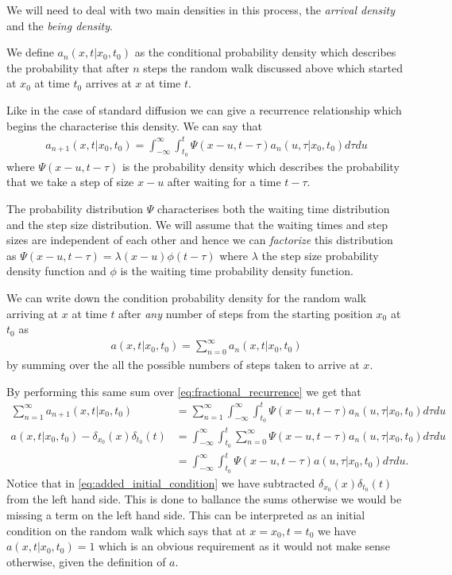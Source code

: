 We will need to deal with two main densities in this process, the \emph{arrival density} and the \emph{being density}. 

We define $ a_n(x,t|x_0,t_0) $ as the conditional probability density which describes the probability that after $ n $ steps the random walk discussed above which started at $ x_0 $ at time $ t_0 $ arrives at $ x $ at time $ t $. 

Like in the case of standard diffusion we can give a recurrence relationship which begins the characterise this density. We can say that
\begin{align}
    \label{eq:fractional_recurrence}
    a_{n+1}(x,t|x_0,t_0) = \int_{-\infty}^\infty \int_{t_0}^t \Psi(x - u, t - \tau)a_n(u, \tau|x_0, t_0) d\tau du
\end{align}
where $ \Psi(x - u, t - \tau) $ is the probability density which describes the probability that we take a step of size $ x - u $ after waiting for a time $ t - \tau $. 

The probability distribution $ \Psi $ characterises both the waiting time distribution and the step size distribution. We will assume that the waiting times and step sizes are independent of each other and hence we can \emph{factorize} this distribution as $ \Psi(x - u, t - \tau) = \lambda(x - u)\phi(t - \tau) $ where $ \lambda $ the step size probability density function and $ \phi $ is the waiting time probability density function.

We can write down the condition probability density for the random walk arriving at $ x $ at time $ t $ after \emph{any} number of steps from the starting position $ x_0 $ at $ t_0 $ as
\begin{align}
    a(x,t|x_0,t_0) = \sum_{n=0}^\infty a_n(x,t|x_0,t_0) 
\end{align}
by summing over the all the possible numbers of steps taken to arrive at $ x $. 

By performing this same sum over \eqref{eq:fractional_recurrence} we get that
\begin{align}
   \sum_{n=1}^\infty a_{n+1}(x,t|x_0,t_0) &= \sum_{n=1}^\infty \int_{-\infty}^\infty \int_{t_0}^t \Psi(x - u, t - \tau)a_n(u, \tau|x_0, t_0) d\tau du \\
    \label{eq:added_initial_condition}
    a(x,t|x_0,t_0) - \delta_{x_0}(x) \delta_{t_0}(t) &=  \int_{-\infty}^\infty \int_{t_0}^t \sum_{n=0}^\infty \Psi(x - u, t - \tau)a_n(u, \tau|x_0, t_0) d\tau du \\
    &= \int_{-\infty}^\infty \int_{t_0}^t  \Psi(x - u, t - \tau)a(u, \tau|x_0, t_0) d\tau du.
\end{align}
Notice that in \eqref{eq:added_initial_condition} we have subtracted $ \delta_{x_0}(x) \delta_{t_0}(t) $ from the left hand side. This is done to ballance the sums otherwise we would be missing a term on the left hand side. This can be interpreted as an initial condition on the random walk which says that at $ x = x_0, t= t_0 $ we have $ a(x,t|x_0,t_0) = 1 $ which is an obvious requirement as it would not make sense otherwise, given the definition of $ a $.

